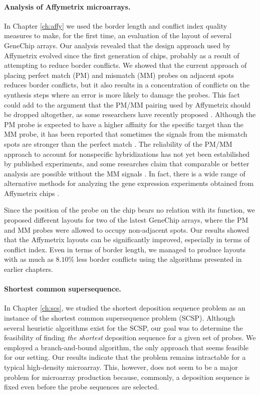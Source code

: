\paragraph{Analysis of Affymetrix microarrays.} In Chapter \ref{ch:affy} we used
the border length and conflict index quality measures to make, for the first time, an
evaluation of the layout of several GeneChip arrays. Our analysis
revealed that the design approach used by Affymetrix
evolved since the first generation of chips, probably as a result of attempting
to reduce border conflicts. We showed that the current approach of placing
perfect match (PM) and mismatch (MM) probes on adjacent spots reduces
border conflicts, but it also results in a concentration of
conflicts on the synthesis steps where an error is more likely to damage the
probes. This fact could add to the argument that the PM/MM pairing used by
Affymetrix should be dropped altogether, as some researchers have recently
proposed \citep{Lauren2003}. Although the PM probe is expected to have a higher
affinity for the specific target than the MM probe, it has been reported that
sometimes the signals from the mismatch spots are stronger than the perfect
match \citep{Naef2003}. The reliability of the PM/MM approach to account for
nonspecific hybridizations has not yet been estabilished by published
experiments, and some researches claim that comparable or better analysis are
possible without the MM signals \citep{Irizarry2003}. In fact, there is a wide
range of alternative methods for analyzing the gene expression experiments
obtained from Affymetrix chips \citep{Irizarry2006,Millenaar2006}.

Since the position of the probe on the chip bears no relation with its function,
we proposed different layouts for two of the latest GeneChip arrays, where the
PM and MM probes were allowed to occupy non-adjacent spots. Our results showed
that the Affymetrix layouts can be significantly improved, especially in terms
of conflict index. Even in terms of border length, we managed to produce layouts
with as much as $8.10\%$ less border conflicts using the algorithms presented in
earlier chapters.

\paragraph{Shortest common supersequence.}
In Chapter \ref{ch:scs}, we studied the shortest deposition sequence problem as
an instance of the shortest common supersequence problem (SCSP). Although several
heuristic algorithms exist for the SCSP, our goal was to determine the
feasibility of finding \emph{the shortest} deposition sequence for a given set
of probes. We employed a branch-and-bound algorithm, the only approach that
seems feasible for our setting. Our results indicate that the problem remains
intractable for a typical high-density microarray. This, however, does not seem
to be a major problem for microarray production because, commonly, a deposition
sequence is fixed even before the probe sequences are selected.

